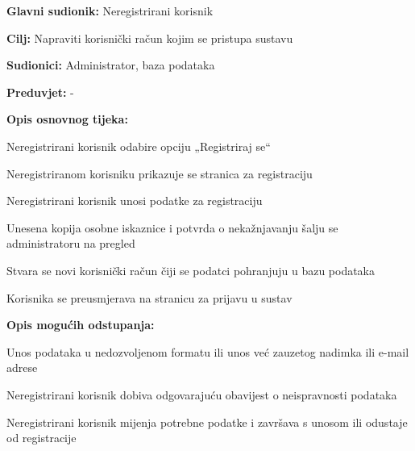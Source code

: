 							\noindent {}
						\begin{packed_item}
							
							\item \textbf{Glavni sudionik: } Neregistrirani korisnik
							\item  \textbf{Cilj:} Napraviti korisnički račun kojim se pristupa sustavu
							\item  \textbf{Sudionici:} Administrator, baza podataka
							\item  \textbf{Preduvjet:} -
							\item  \textbf{Opis osnovnog tijeka:}
							
							\item[] \begin{packed_enum}
								
								\item Neregistrirani korisnik odabire opciju „Registriraj se“ 
								\item Neregistriranom korisniku prikazuje se stranica za registraciju 
								\item Neregistrirani korisnik unosi podatke za registraciju 
								\item Unesena kopija osobne iskaznice i potvrda o nekažnjavanju šalju se administratoru na pregled 
								\item Stvara se novi korisnički račun čiji se podatci pohranjuju u bazu podataka 
								\item Korisnika se preusmjerava na stranicu za prijavu u sustav 
								
							\end{packed_enum}
							
							\item  \textbf{Opis mogućih odstupanja:}
							
							\item[] \begin{packed_item}
								
								\item[3.a] Unos podataka u nedozvoljenom formatu ili unos već zauzetog nadimka ili e-mail adrese 
								\item[] \begin{packed_enum}
									
									\item Neregistrirani korisnik dobiva odgovarajuću obavijest o neispravnosti podataka 
									\item Neregistrirani korisnik mijenja potrebne podatke i završava s unosom ili odustaje od registracije 
									
								\end{packed_enum}
								
								
							\end{packed_item}
						\end{packed_item}
